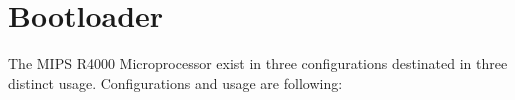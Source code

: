 %
%
%
%
%
%

%
%

\chapter{Bootloader}

The MIPS R4000 Microprocessor exist in three configurations destinated in three distinct usage.
Configurations and usage are following: